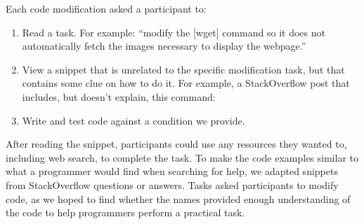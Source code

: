 \begin{changes}
Each code modification asked a participant to:
\begin{enumerate}
    \item Read a task.  For example: ``modify the [wget] command so it does not automatically fetch the images necessary to display the webpage.''
\item View a snippet that is unrelated to the specific modification task, but that contains some clue on how to do it.  For example, a StackOverflow post that includes, but doesn't explain, this command:
\vspace{.2em}
\vspace{.6em}
\item Write and test code against a condition we provide.
\end{enumerate}

After reading the snippet, participants could use any resources they wanted to, including web search, to complete the task.
To make the code examples similar to what a programmer would find when searching for help, we adapted snippets from StackOverflow questions or answers.
Tasks asked participants to modify code, as we hoped to find whether the \Glspl{name} provided enough understanding of the code to help programmers perform a practical task.
\end{changes}

